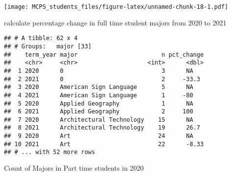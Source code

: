 \documentclass[]{article}
\newenvironment{Shaded}{\begin{snugshade}}{\end{snugshade}}
\newcommand{\DataTypeTok}[1]{\textcolor[rgb]{0.13,0.29,0.53}{#1}}
\newcommand{\DecValTok}[1]{\textcolor[rgb]{0.00,0.00,0.81}{#1}}
\newcommand{\KeywordTok}[1]{\textcolor[rgb]{0.13,0.29,0.53}{\textbf{#1}}}
\newcommand{\NormalTok}[1]{#1}
\newcommand{\OperatorTok}[1]{\textcolor[rgb]{0.81,0.36,0.00}{\textbf{#1}}}
\newcommand{\OtherTok}[1]{\textcolor[rgb]{0.56,0.35,0.01}{#1}}
\newcommand{\StringTok}[1]{\textcolor[rgb]{0.31,0.60,0.02}{#1}}
\begin{document}
\texttt{[image: MCPS\_students\_files/figure-latex/unnamed-chunk-18-1.pdf]}

calculate percentage change in full time student majors from 2020 to
2021

\begin{Shaded}
\end{Shaded}

\begin{verbatim}
## # A tibble: 62 x 4
## # Groups:   major [33]
##    term_year major                        n pct_change
##    <chr>     <chr>                    <int>      <dbl>
##  1 2020      0                            3      NA   
##  2 2021      0                            2     -33.3 
##  3 2020      American Sign Language       5      NA   
##  4 2021      American Sign Language       1     -80   
##  5 2020      Applied Geography            1      NA   
##  6 2021      Applied Geography            2     100   
##  7 2020      Architectural Technology    15      NA   
##  8 2021      Architectural Technology    19      26.7 
##  9 2020      Art                         24      NA   
## 10 2021      Art                         22      -8.33
## # ... with 52 more rows
\end{verbatim}

Count of Majors in Part time students in 2020
\end{document}
